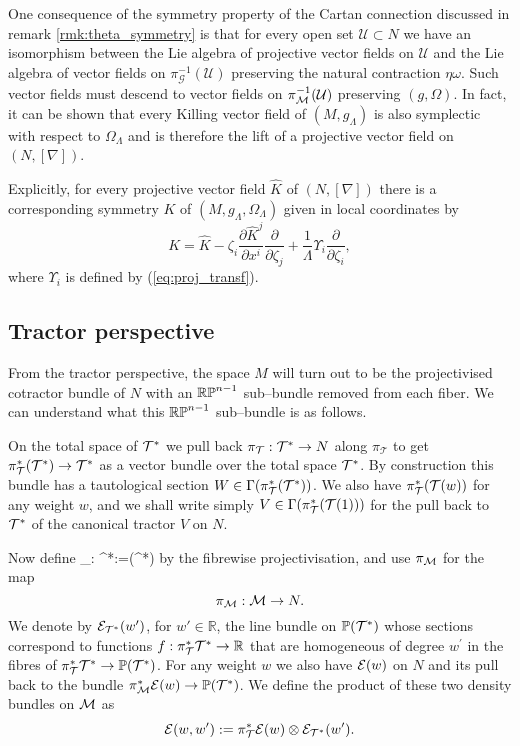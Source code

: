 One consequence of the symmetry property of the Cartan connection discussed in remark \ref{rmk:theta_symmetry} is that for every open set $\mathcal{U}\subset N$ we have an isomorphism between the Lie algebra of projective vector fields on $\mathcal{U}$ and the Lie algebra of vector fields on $\pi_\mathcal{G}^{-1}(\mathcal{U})$ preserving the natural contraction $\eta\omega$. Such vector fields must descend to vector fields on $\pi_{\mathcal{M}}^{-1}(\mathcal{U})$ preserving $(g,\Omega)$. In fact, it can be shown that every Killing vector field of $(M,g_\Lambda)$ is also symplectic with respect to $\Omega_\Lambda$ and is therefore the lift of a projective vector field on $(N,[\nabla])$.

Explicitly, for every projective vector field $\widehat{K}$ of $(N,[\nabla])$
there is a corresponding symmetry $K$ of $(M,g_{\Lambda},\Omega_\Lambda)$
given in local coordinates by 
\begin{equation}
{K}=\widehat{K}-\zeta_{i}\frac{\partial \widehat{K}^{j}}{\partial x^{i}}\frac{\partial}{\partial \zeta_{j}}+\frac{1}{\Lambda}\Upsilon_{i}\frac{\partial}{\partial \zeta_{i}},\label{eq:kvf_from_pvf}
\end{equation}
where $\Upsilon_{i}$ is defined by (\ref{eq:proj_transf}).

\subsection{Tractor perspective} \label{sec:trac_construction}

From the tractor perspective, the space $M$ will turn out to be the projectivised cotractor bundle of $N$ with an $\mathbb{RP}^{n-1}$ sub--bundle removed from each fiber. We can understand what this $\mathbb{RP}^{n-1}$ sub--bundle is as follows.

On the total space of $\mathcal{T}^*$ we pull back $\pi_\mathcal{T}:\mathcal{T}^*\to N$ along $\pi_\mathcal{T}$ to get $\pi_\mathcal{T}^*(\mathcal{T}^*)\to \mathcal{T}^*$ as a vector bundle over the total space $\mathcal{T}^*$. By construction this bundle has a tautological section $W\in \Gamma (\pi_{\mathcal{T}}^*(\mathcal{T}^*))$.  We also have $\pi_{\mathcal{T}}^*(\mathcal{T}(w))$ for any weight $w$, and we shall write simply $V\in \Gamma(\pi_{\mathcal{T}}^*(\mathcal{T}(1)))$ for the pull back to $\mathcal{T}^*$ of the canonical tractor $V$ on $N$.

Now define
\be
\label{projection_map}
\kappa_\PP: \cT^*\longrightarrow {}:=(\cT^*)
\ee
by the fibrewise projectivisation, and use $\pi_{\mathcal{M}}$ for the map
$$
\pi_{\mathcal{M}}:\mathcal{M}\to N.
$$
We denote by $\mathcal{E}_{\mathcal{T}^*}(w')$, for $w'\in \mathbb{R}$, the line
bundle on $\mathbb{P}(\mathcal{T}^*)$ whose sections correspond to functions
$f: \pi_{\mathcal{T}}^*\mathcal{T}^* \to\mathbb{R} $ that are homogeneous of degree $w^\prime$ in
the fibres of $\pi_{\mathcal{T}}^*\mathcal{T}^*\to \mathbb{P}(\mathcal{T}^*)$. For any weight $w$ we also have $\mathcal{E}(w)$ on $N$ and its pull back to the bundle $\pi_{\mathcal{M}}^*\mathcal{E}(w)\to \mathbb{P}(\mathcal{T}^*)$.
We define the product of these two density bundles on $\mathcal{M}$ as
$$
\mathcal{E}(w,w'):= \pi_{\mathcal{T}}^*\mathcal{E}(w) \otimes \mathcal{E}_{\mathcal{T}^*}(w').
$$

